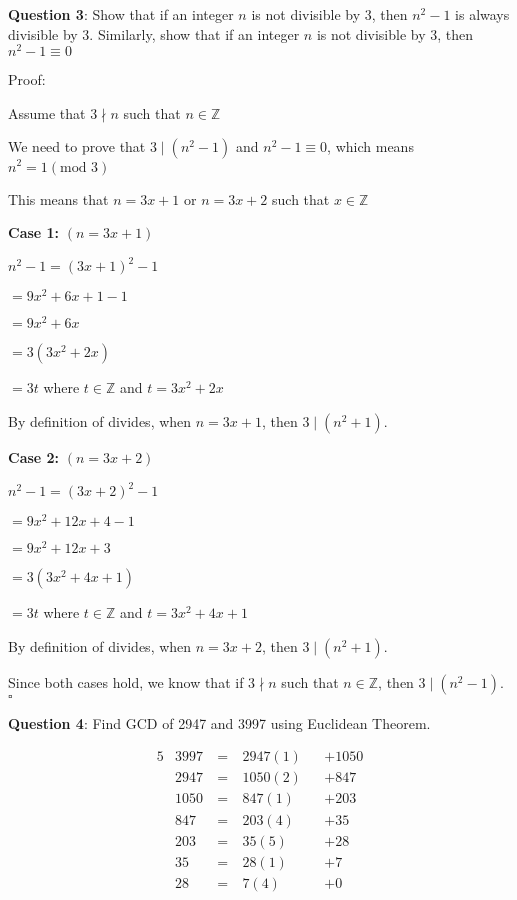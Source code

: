 \documentclass{article} %
\newcommand{\question}[2][]{\begin{flushleft}
        \textbf{Question #1}: #2

\end{flushleft}}
\begin{document}
    \newpage

    \question[3]{Show that if an integer $n$ is not divisible by 3, then $n^2 - 1$ is always divisible by 3. 
    Similarly, show that if an integer $n$ is not divisible by 3, then $n^2 - 1 \equiv 0$}

    Proof:

    Assume that $3 \nmid n$ such that $n \in \mathbb{Z}$

    We need to prove that $3 \mid (n^2 - 1)$ and $n^2 - 1 \equiv 0$, which means $n^2 = 1 (\text{mod } 3)$

    This means that $n = 3x + 1$ or $n = 3x + 2$ such that $x \in \mathbb{Z}$

    \textbf{Case 1:} $(n = 3x + 1)$

    \tabto{1cm} $n^2 - 1 = (3x + 1)^2 - 1$

    \tabto{2.07cm} $= 9x^2 + 6x + 1 - 1$

    \tabto{2.07cm} $= 9x^2 + 6x$

    \tabto{2.07cm} $= 3(3x^2 + 2x)$

    \tabto{2.07cm} $= 3t$ where $t \in \mathbb{Z}$ and $t = 3x^2 + 2x$

    \tabto{1cm} By definition of divides, when $n = 3x + 1$, then $3 \mid (n^2 + 1)$.

    \textbf{Case 2:} $(n = 3x + 2)$

    \tabto{1cm} $n^2 - 1 = (3x + 2)^2 - 1$

    \tabto{2.07cm} $= 9x^2 + 12x + 4 - 1$

    \tabto{2.07cm} $= 9x^2 + 12x + 3$

    \tabto{2.07cm} $= 3(3x^2 + 4x + 1)$

    \tabto{2.07cm} $= 3t$ where $t \in \mathbb{Z}$ and $t = 3x^2 + 4x + 1$

    \tabto{1cm} By definition of divides, when $n = 3x + 2$, then $3 \mid (n^2 + 1)$.

    Since both cases hold, we know that if $3 \nmid n$ such that $n \in \mathbb{Z}$, then $3 \mid (n^2 - 1)$. $\square$

    \question[4]{Find GCD of 2947 and 3997 using Euclidean Theorem.}
    \begin{alignat*}{5}
        &3997\ &=\ &2947(1) &&+ 1050\\
        &2947  &=\ &1050(2) &&+ 847\\
        &1050  &=\ &847(1)  &&+ 203\\
        &847   &=\ &203(4)  &&+ 35\\
        &203   &=\ &35(5)   &&+ 28\\
        &35    &=\ &28(1)   &&+ 7\\
        &28    &=\ &7(4)    &&+ 0
    \end{alignat*}
\end{document}
